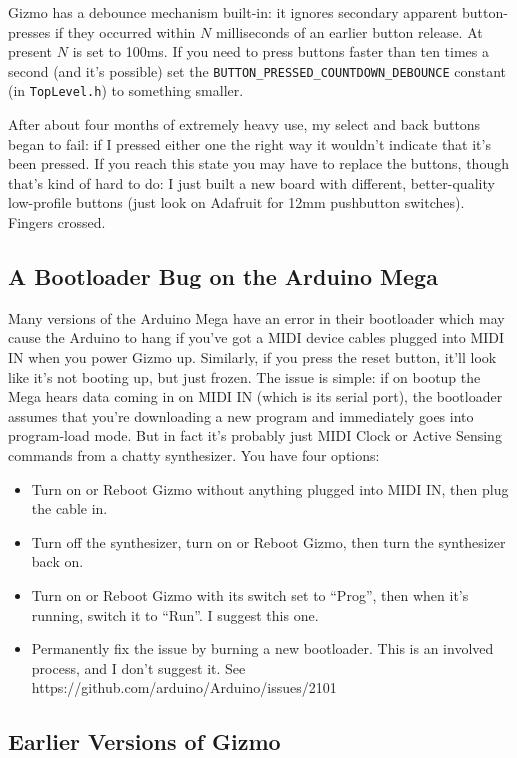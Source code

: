 \documentclass{article}
\begin{document}
Gizmo has a debounce mechanism built-in: it ignores secondary apparent button-presses if they occurred within \(N\) milliseconds of an earlier button release.  At present \(N\) is set to 100ms.  If you need to press buttons faster than ten times a second (and it's possible) set the \texttt{BUTTON\_PRESSED\_COUNTDOWN\_DEBOUNCE} constant (in \texttt{TopLevel.h}) to something smaller.

After about four months of extremely heavy use, my select and back buttons began to fail: if I pressed either one the right way it wouldn't indicate that it's been pressed.  If you reach this state you may have to replace the buttons, though that's kind of hard to do: I just built a new board with different, better-quality low-profile buttons (just look on Adafruit for 12mm pushbutton switches).  Fingers crossed.

\subsection{A Bootloader Bug on the Arduino Mega}

Many versions of the Arduino Mega have an error in their bootloader which may cause the Arduino to hang if you've got a MIDI device cables plugged into MIDI IN when you power Gizmo up.  Similarly, if you press the reset button, it'll look like it's not booting up, but just frozen.  The issue is simple: if on bootup the Mega hears data coming in on MIDI IN (which is its serial port), the bootloader assumes that you're downloading a new program and immediately goes into program-load mode.    But in fact it's probably just MIDI Clock or Active Sensing commands from a chatty synthesizer.  You have four options:

\begin{itemize}
\item Turn on or Reboot Gizmo without anything plugged into MIDI IN, then plug the cable in.
\item Turn off the synthesizer, turn on or Reboot Gizmo, then turn the synthesizer back on.
\item Turn on or Reboot Gizmo with its switch set to ``Prog'', then when it's running, switch it to ``Run''.  I suggest this one.
\item Permanently fix the issue by burning a new bootloader.  This is an involved process, and I don't suggest it.  See https:/\!/github.com/arduino/Arduino/issues/2101
\end{itemize}

\subsection{Earlier Versions of Gizmo}
\end{document}
